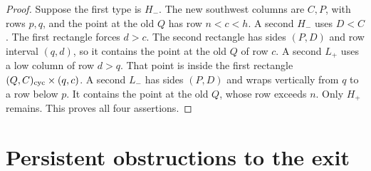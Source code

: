 \documentclass[11pt,oneside]{report}
\theoremstyle{definition}
\numberwithin{equation}{section}
\newcommand{\Lp}{L_+}\newcommand{\Lm}{L_-}
\newcommand{\Hp}{H_+}\newcommand{\Hm}{H_-}
\begin{document}
\begin{proof}
Suppose the first type is $\Hm$. The new southwest columns are $C,P$,
with rows $p,q$, and the point at the old $Q$ has row $n<c<h$.
A second $\Hm$ uses $D<C$. The first rectangle forces $d>c$.
The second rectangle has sides $(P,D)$ and row interval $(q,d)$, so it
contains the point at the old $Q$ of row $c$.
A second $\Lp$ uses a low column of row $d>q$. That point is inside the
first rectangle $(Q,C)_{\rm cyc}\times(q,c)$.
A second $\Lm$ has sides $(P,D)$ and wraps vertically from $q$ to a row
below $p$. It contains the point at the old $Q$, whose row exceeds $n$.
Only $\Hp$ remains. This proves all four assertions.
\end{proof}

\section{Persistent obstructions to the exit}
\end{document}
